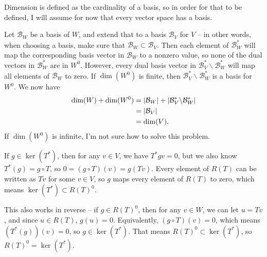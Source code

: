 \documentclass{article}
\begin{document}
\bigskip
\par
\begin{prob}
\end{prob}
Dimension is defined as the cardinality of a basis, so in order for that to be defined, I will assume for now that every vector space has a basis.
\par
Let $\mathcal{B}_W$ be a basis of $W$, and extend that to a basis $\mathcal{B}_V$ for $V$ -- in other words, when choosing a basis, make sure that $\mathcal{B}_W \subset \mathcal{B}_V$. Then each element of $\mathcal{B}_W^*$ will map the corresponding basis vector in $\mathcal{B}_W$ to a nonzero value, so none of the dual vectors in $\mathcal{B}_W^*$ are in $W^0$. However, every dual basis vector in $\mathcal{B}_V^* \backslash \mathcal{B}_W^*$ will map all elements of $\mathcal{B}_W$ to zero. If $\dim(W^0)$ is finite, then $\mathcal{B}_V^* \backslash \mathcal{B}_W^*$ is a basis for $W^0$. We now have
\begin{align*}
    \dim(W) + \dim(W^0) &= \left\lvert \mathcal{B}_W \right\rvert + \left\lvert \mathcal{B}_V^* \backslash \mathcal{B}_W^* \right\rvert \\
                        &= \left\lvert \mathcal{B}_V \right\rvert \\
                        &= \dim(V).
\end{align*}
If $\dim(W^0)$ is infinite, I'm not sure how to solve this problem.

\bigskip
\par
\begin{prob}
\end{prob}
If $g \in \ker(T^*)$, then for any $v \in V$, we have $T^*gv = 0$, but we also know $T^*(g) = g \circ T$, so $0 = (g \circ T)(v) = g(Tv)$. Every element of $R(T)$ can be written as $Tv$ for some $v \in V$, so $g$ maps every element of $R(T)$ to zero, which means $\ker(T^*) \subset R(T)^0$.
\par
This also works in reverse -- if $g \in R(T)^0$, then for any $v \in W$, we can let $u=Tv$, and since $u \in R(T)$, $g(u)=0$. Equivalently, $(g \circ T)(v) = 0$, which means $(T^*(g))(v)=0$, so $g \in \ker(T^*)$. That means $R(T)^0 \subset \ker(T^*)$, so $R(T)^0 = \ker(T^*)$.
\end{document}
